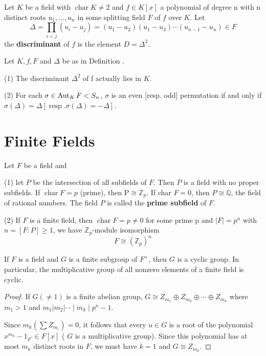\begin{definition}
    Let $K$ be a field with $\operatorname{char}  K  \neq 2$ and $ f  \in  K [ x ]$ a polynomial of degree n with n distinct roots $ u _1, \ldots, u_n $ in some splitting field $F$ of $f$ over $K$.
    Let
    \begin{equation*}
        \Delta=\prod_{i<j}\left( u _{{i}}- u _{{j}}\right)=\left( u _1- u _2\right)\left( u _1- u _3\right) \cdots\left( u _{{n}-1}- u _{{n}}\right) \in F
    \end{equation*}
    the \textbf{discriminant} of $f$ is the element ${D}=\Delta^2$.
\end{definition}


\begin{proposition}
    Let $ K ,  f , {F}$ and $\Delta$ be as in Definition .

    (1) The discriminant $\Delta^2$ of f actually lies in $K$.

    (2) For each $\sigma \in \operatorname{\operatorname{Aut}}_{ K } F < S_{{n}}$, $\sigma$ is an even [resp. odd] permutation if and only if $\sigma(\Delta)=\Delta[\operatorname{resp} . \sigma(\Delta)=-\Delta]$.
\end{proposition}
\section{Finite Fields}%
\begin{theorem}
    Let $F$ be a field and

    (1)
    let $P$ be the intersection of all subfields of $F$.
    Then $P$ is a field with no proper subfields. If  $\operatorname{char} F=p$ (prime), then $\mathrm{P} \cong \mathbb{Z}_{p}$. If char $F=0$, then $P\cong \mathbb{Q}$, the field of rational numbers.
    The field $P$ is called the \textbf{prime subfield} of $F$.

    (2)
    If $F$ is a finite field, then  $\operatorname{char} F=p \neq 0$ for some prime p and $|F|=p^{n}$ with $n=\left[F:P\right] \geq 1$, we have $\mathbb{Z}_p$-module isomorphism
    \begin{equation*}
        F\cong  \left(\mathbb{Z}_p\right)^n
    \end{equation*}
\end{theorem}


\begin{theorem}
    If $F$ is a field and $G$ is a finite subgroup of $F^\times$, then $G$ is a cyclic group.
    In particular, the multiplicative group of all nonzero elements of a finite field is cyclic.
    \begin{proof}
        If $G(\neq 1)$ is a finite abelian group, $G \cong Z_{m_1} \oplus Z_{m_2} \oplus \cdots \oplus Z_{m_k}$ where $m_1>1$ and $m_1\left|m_2\right| \cdots \mid m_k\mid p^n -1$.

        Since $m_k\left(\sum Z_{m_i}\right)=0$, it follows that every $u \in G$ is a root of the polynomial
        $x^{m_k}-1_{F^{\prime}} \in F[x]$
        ( $G$ is a multiplicative group).
        Since this polynomial has at most $m_k$ distinct roots in $F$, we must have $k=1$ and $G \cong Z_{m_k}$.
    \end{proof}


\end{theorem}

